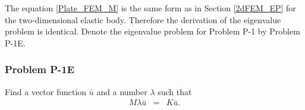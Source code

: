 \documentclass[../../main.tex]{subfiles}
\begin{document}
The equation \eqref{Plate_FEM_M} is the same form as in Section \ref{2dFEM_EP} for the two-dimensional elastic body. Therefore the derivation of the eigenvalue problem is identical. Denote the eigenvalue problem for Problem P-1 by Problem P-1E.
\subsubsection{Problem P-1E}
Find a vector function $\bar{u}$ and a number $\lambda$ such that
\begin{eqnarray}
	M\lambda{\bar{u}} & = & K\bar{u}.
\end{eqnarray}
\end{document}
